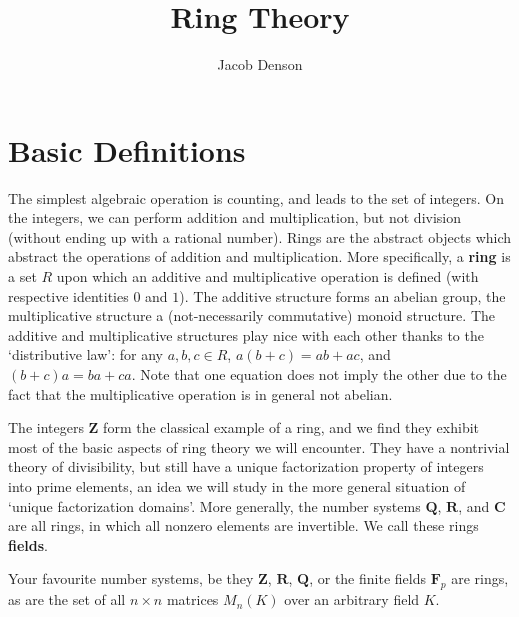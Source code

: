 

\title{Ring Theory}
\author{Jacob Denson}



\maketitle
\tableofcontents

\chapter{Basic Definitions}


The simplest algebraic operation is counting, and leads to the set of integers. On the integers, we can perform addition and multiplication, but not division (without ending up with a rational number). Rings are the abstract objects which abstract the operations of addition and multiplication. More specifically, a {\bf ring} is a set $R$ upon which an additive and multiplicative operation is defined (with respective identities $0$ and $1$). The additive structure forms an abelian group, the multiplicative structure a (not-necessarily commutative) monoid structure. The additive and multiplicative structures play nice with each other thanks to the `distributive law': for any $a, b, c \in R$, $a(b + c) = ab + ac$, and $(b + c)a = ba + ca$. Note that one equation does not imply the other due to the fact that the multiplicative operation is in general not abelian.

\begin{example}
    The integers $\mathbf{Z}$ form the classical example of a ring, and we find they exhibit most of the basic aspects of ring theory we will encounter. They have a nontrivial theory of divisibility, but still have a unique factorization property of integers into prime elements, an idea we will study in the more general situation of `unique factorization domains'. More generally, the number systems $\mathbf{Q}$, $\mathbf{R}$, and $\mathbf{C}$ are all rings, in which all nonzero elements are invertible. We call these rings {\bf fields}.
\end{example}

\begin{example}
    Your favourite number systems, be they $\mathbf{Z}$, $\mathbf{R}$, $\mathbf{Q}$, or the finite fields $\mathbf{F}_p$ are rings, as are the set of all $n \times n$ matrices $M_n(K)$ over an arbitrary field $K$.
\end{example}

